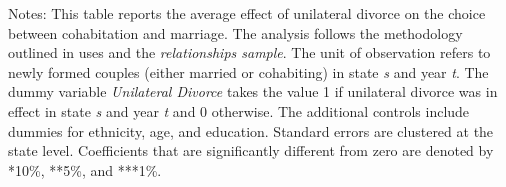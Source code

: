 \begin{table}[H]\centering                                  \scriptsize                                 \caption{The average effect of unilateral divorce on the choice between cohabitation and marriage among newly formed couples}                                   \label{tab:tabrel}                                 
\begin{minipage}{\textwidth}
\scriptsize\smallskip
Notes: This table reports the average effect of unilateral divorce on the choice between cohabitation and marriage. The analysis follows the methodology outlined in \cite{borusyak2021} uses and the \textit{relationships sample}. The unit of observation refers to newly formed couples (either married or cohabiting) in state \textit{s} and year \textit{t}. The dummy variable \textit{Unilateral Divorce} takes the value 1 if unilateral divorce was in effect in state \textit{s} and year \textit{t} and 0 otherwise. The additional controls include dummies for ethnicity, age, and education. Standard errors are clustered at the state level. Coefficients that are significantly different from zero are denoted by *10\%, **5\%, and ***1\%.
\\
\end{minipage}\vspace{-6mm}
\end{table}
